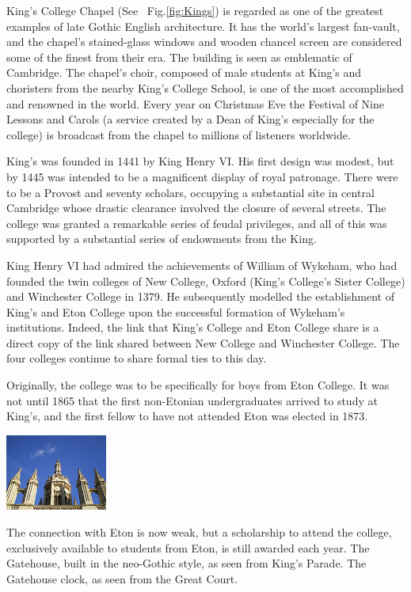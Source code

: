\documentclass{report}
\begin{document}
King's College Chapel (See ~Fig.\ref{fig:Kings}) is regarded as one of the greatest examples of late Gothic English architecture. It has the world's largest fan-vault, and the chapel's stained-glass windows and wooden chancel screen are considered some of the finest from their era. The building is seen as emblematic of Cambridge. The chapel's choir, composed of male students at King's and choristers from the nearby King's College School, is one of the most accomplished and renowned in the world. Every year on Christmas Eve the Festival of Nine Lessons and Carols (a service created by a Dean of King's especially for the college) is broadcast from the chapel to millions of listeners worldwide.

King's was founded in 1441 by King Henry VI. His first design was modest, but by 1445 was intended to be a magnificent display of royal patronage. There were to be a Provost and seventy scholars, occupying a substantial site in central Cambridge whose drastic clearance involved the closure of several streets. The college was granted a remarkable series of feudal privileges, and all of this was supported by a substantial series of endowments from the King.

King Henry VI had admired the achievements of William of Wykeham, who had founded the twin colleges of New College, Oxford (King's College's Sister College) and Winchester College in 1379. He subsequently modelled the establishment of King's and Eton College upon the successful formation of Wykeham's institutions. Indeed, the link that King's College and Eton College share is a direct copy of the link shared between New College and Winchester College. The four colleges continue to share formal ties to this day.

Originally, the college was to be specifically for boys from Eton College. It was not until 1865 that the first non-Etonian undergraduates arrived to study at King's, and the first fellow to have not attended Eton was elected in 1873. \\


\parbox{0.3\textwidth}{ \includegraphics[width=0.25\textwidth]{Pictures/clock.jpg}}
\parbox{0.6\textwidth}{The connection with Eton is now weak, but a scholarship to attend the college, exclusively available to students from Eton, is still awarded each year. The Gatehouse, built in the neo-Gothic style, as seen from King's Parade. The Gatehouse clock, as seen from the Great Court.}
\end{document}
